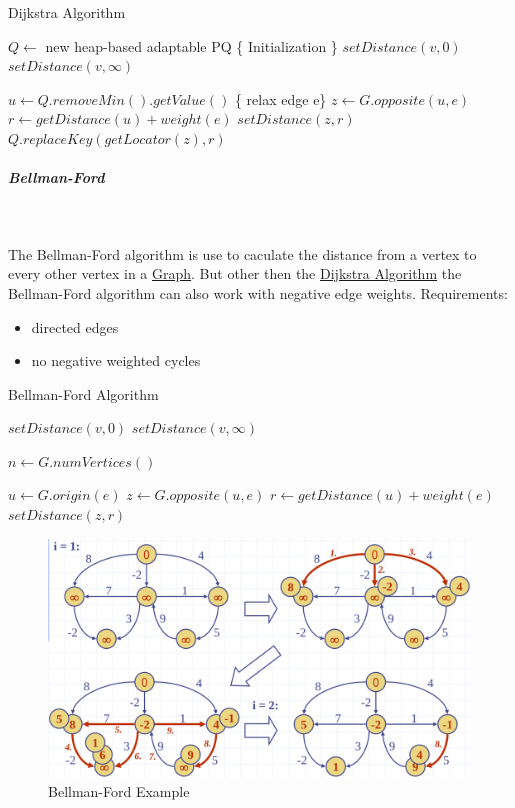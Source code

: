 \documentclass[11pt,twoside,twocolumn,landscape]{article}
\begin{document}
\begin{algorithm}
  \caption{Dijkstra Algorithm}
  \begin{algorithmic}
    \State $Q \gets$ new heap-based adaptable PQ
    \State \{ Initialization \}
    \State $setDistance(v, 0)$
    \Else
    \State $setDistance(v, \infty)$
    \EndIf
    \EndFor

    \State $u \gets Q.removeMin().getValue()$
    \State \{ relax edge e\}
    \State $z \gets G.opposite(u, e)$
    \State $r \gets getDistance(u) + weight(e)$
    \State $setDistance(z,r)$
    \State $Q.replaceKey(getLocator(z), r)$
    \EndIf
    \EndFor
    \EndWhile
    \EndProcedure
  \end{algorithmic}
\end{algorithm}

\subparagraph{Bellman-Ford} \
\label{sec:orga1b41f4}

The Bellman-Ford algorithm is use to caculate the distance from a vertex to every other vertex in a \href{../../../roam/20220201163000-graph.org}{Graph}.
But other then the \href{../../../roam/20220202132913-dijkstra_algorithm.org}{Dijkstra Algorithm} the Bellman-Ford algorithm can also work with negative edge weights.
Requirements:
\begin{itemize}
\item directed edges
\item no negative weighted cycles
\end{itemize}


\begin{algorithm}
  \caption{Bellman-Ford Algorithm}
  \begin{algorithmic}
    \State $setDistance(v, 0)$
    \Else
    \State $setDistance(v, \infty)$
    \EndIf
    \EndFor

    \State $n \gets G.numVertices()$

    \State $u \gets G.origin(e)$
    \State $z \gets G.opposite(u,e)$
    \State $r \gets getDistance(u) + weight(e)$
    \State $setDistance(z,r)$
    \EndIf
    \EndFor
    \EndFor
    \EndProcedure
  \end{algorithmic}
\end{algorithm}


\begin{figure}[htbp]
\centering
\includegraphics[width=.9\linewidth]{img/bellman_ford_example.png}
\caption{\label{fig:org5694cc0}Bellman-Ford Example}
\end{figure}
\end{document}
